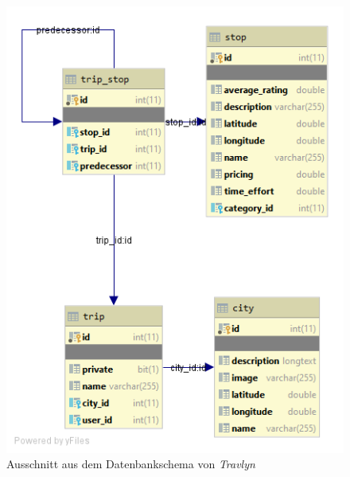 		\begin{figure}[ht!]
			\centering
			\includegraphics[width=1\textwidth]{images/database-schema.png}
			\caption{Ausschnitt aus dem Datenbankschema von \textit{Travlyn}}
			\label{fig:database_schema}
		\end{figure} 
	